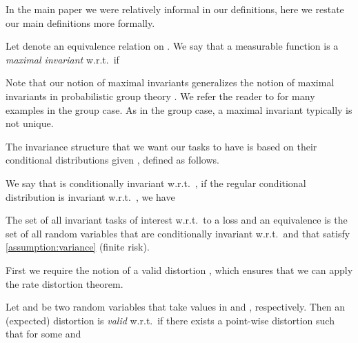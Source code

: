 \documentclass[final]{article}
\begin{document}
In the main paper we were relatively informal in our definitions, here we restate our main definitions more formally.



\begin{definition}\label{def:maximal_invariant}
Let  denote an equivalence relation on .
We say that a measurable function  is a \textit{maximal invariant} w.r.t.\   if

\end{definition}

Note that our notion of maximal invariants generalizes the notion of maximal invariants in probabilistic group theory \cite{eaton_group_1989}. 
We refer the reader to \citet{lehmann_testing_2005} for many examples in the group case. As in the group case, a maximal invariant typically is not unique. 


The invariance structure that we want our tasks to have is based on their conditional distributions given , defined as follows.

\begin{definition}\label{def:cond_invariance}
We say that  is conditionally invariant w.r.t.\  , if the regular conditional distribution  is invariant w.r.t.\ , \ie  we have 

\end{definition}


\begin{definition}\label{def:invariant_tasks_interest}
The set of all invariant tasks of interest  w.r.t.\ to a loss and an  equivalence  is the set of all random variables  that are conditionally invariant w.r.t.\  and that satisfy \cref{assumption:variance} (finite risk).
\end{definition}



First we require the notion of a valid distortion \cite{berger_rate_1968}, which ensures that we can apply the rate distortion theorem.


\begin{definition}\label{def:valid_distortion}
Let  and  be two random variables that take values in  and , respectively.
Then an (expected) distortion  is \textit{valid} w.r.t.\  if there exists a point-wise distortion  such that  for some  and 

\end{definition}
\end{document}

